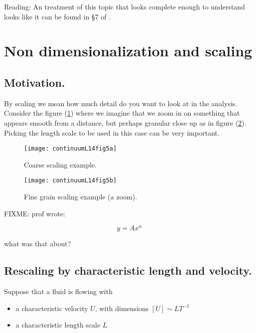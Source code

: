 Reading: An treatment of this topic that looks complete enough to understand looks like it can be found in \S 7 of \cite{landau1987course}.

\section{Non dimensionalization and scaling}

\subsection{Motivation.}

By scaling we mean how much detail do you want to look at in the analysis.  Consider the figure (\ref{fig:continuumL14:continuumL14fig5a}) where we imagine that we zoom in on something that appears smooth from a distance, but perhaps granular close up as in figure (\ref{fig:continuumL14:continuumL14fig5b}).  Picking the length scale to be used in this case can be very important.

\begin{figure}[htp]
   \centering
   \texttt{[image: continuumL14fig5a]}
   \caption{Coarse scaling example.}\label{fig:continuumL14:continuumL14fig5a}
\end{figure}

\begin{figure}[htp]
   \centering
   \texttt{[image: continuumL14fig5b]}
   \caption{Fine grain scaling example (a zoom).}\label{fig:continuumL14:continuumL14fig5b}
\end{figure}

FIXME: prof wrote:

\begin{equation}\label{eqn:continuumL14:210}
y = A x^\alpha
\end{equation}

what was that about?

\subsection{Rescaling by characteristic length and velocity.}

Suppose that a fluid is flowing with

\begin{itemize}
\item a characteristic velocity $U$, with dimensions $[U] \sim L T^{-1}$
\item a characteristic length scale $L$
\end{itemize}

